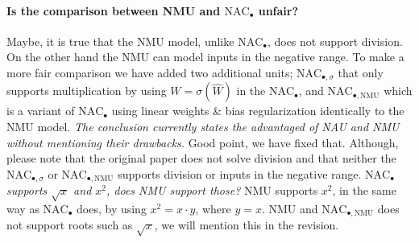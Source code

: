 \documentclass{article}
\begin{document}
\vspace{-0.3cm} \paragraph{Is the comparison between NMU and $\mathrm{NAC}_{\bullet}$ unfair?} %
Maybe, it is true that the NMU model, unlike $\mathrm{NAC}_{\bullet}$, does not support division.
On the other hand the NMU can model inputs in the negative range.
To make a more fair comparison we have added two additional units; $\mathrm{NAC}_{\bullet, \sigma}$ that only supports multiplication by using $W = \sigma(\hat{W})$ in the $\mathrm{NAC}_{\bullet}$, and $\mathrm{NAC}_{\bullet, \mathrm{NMU}}$ which is a variant of $\mathrm{NAC}_{\bullet}$ using linear weights \& bias regularization identically to the NMU model.
\textit{The conclusion currently states the advantaged of NAU and NMU without mentioning their drawbacks.} Good point, we have fixed that. Although, please note that the original paper does not solve division and that neither the $\mathrm{NAC}_{\bullet, \sigma}$ or $\mathrm{NAC}_{\bullet, \mathrm{NMU}}$ supports division or inputs in the negative range. %
\textit{$\mathrm{NAC}_{\bullet}$ supports $\sqrt{x}$ and $x^2$, does NMU support those?} NMU supports $x^2$, in the same way as $\mathrm{NAC}_{\bullet}$ does, by using $x^2 = x \cdot y$,  where $y = x$.
NMU and $\mathrm{NAC}_{\bullet, \mathrm{NMU}}$ does not support roots such as $\sqrt{x}$, we will mention this in the revision.
\end{document}
